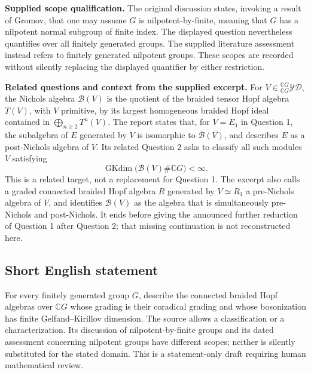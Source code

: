 \documentclass[11pt]{article}
\newcommand{\C}{\mathbb{C}}
\begin{document}
\textbf{Supplied scope qualification.} The original discussion states, invoking a result of Gromov, that one may assume \(G\) is nilpotent-by-finite, meaning that \(G\) has a nilpotent normal subgroup of finite index. The displayed question nevertheless quantifies over all finitely generated groups. The supplied literature assessment instead refers to finitely generated nilpotent groups. These scopes are recorded without silently replacing the displayed quantifier by either restriction.

\textbf{Related questions and context from the supplied excerpt.} For \(V\in{}^{\C G}_{\C G}\mathcal{YD}\), the Nichols algebra \(\mathcal B(V)\) is the quotient of the braided tensor Hopf algebra \(T(V)\), with \(V\) primitive, by its largest homogeneous braided Hopf ideal contained in \(\bigoplus_{n\ge2}T^n(V)\). The report states that, for \(V=E_1\) in Question 1, the subalgebra of \(E\) generated by \(V\) is isomorphic to \(\mathcal B(V)\), and describes \(E\) as a post-Nichols algebra of \(V\). Its related Question 2 asks to classify all such modules \(V\) satisfying
\[
\operatorname{GKdim}\bigl(\mathcal B(V)\#\C G\bigr)<\infty.
\]
This is a related target, not a replacement for Question 1. The excerpt also calls a graded connected braided Hopf algebra \(R\) generated by \(V\simeq R_1\) a pre-Nichols algebra of \(V\), and identifies \(\mathcal B(V)\) as the algebra that is simultaneously pre-Nichols and post-Nichols. It ends before giving the announced further reduction of Question 1 after Question 2; that missing continuation is not reconstructed here.
\subsection{Short English statement}
For every finitely generated group \(G\), describe the connected braided Hopf algebras over \(\C G\) whose grading is their coradical grading and whose bosonization has finite Gelfand--Kirillov dimension. The source allows a classification or a characterization. Its discussion of nilpotent-by-finite groups and its dated assessment concerning nilpotent groups have different scopes; neither is silently substituted for the stated domain. This is a statement-only draft requiring human mathematical review.
\end{document}
